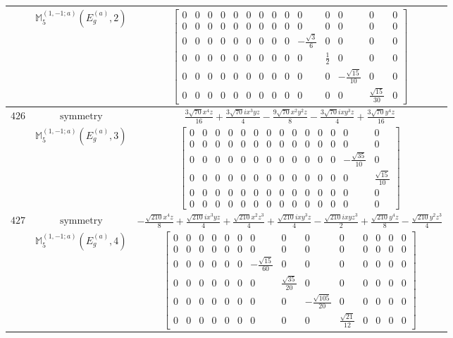 \documentclass[fleqn,8pt,landscape]{jsarticle}
\begin{document}
\begin{longtable}{ccc}
$  $ & $ \mathbb{M}_{5}^{(1,-1;a)}(E_{g}^{(a)},2) $ & $ \begin{bmatrix} 0 & 0 & 0 & 0 & 0 & 0 & 0 & 0 & 0 & 0 & 0 & 0 & 0 & 0 \\ 0 & 0 & 0 & 0 & 0 & 0 & 0 & 0 & 0 & 0 & 0 & 0 & 0 & 0 \\ 0 & 0 & 0 & 0 & 0 & 0 & 0 & 0 & 0 & - \frac{\sqrt{3}}{6} & 0 & 0 & 0 & 0 \\ 0 & 0 & 0 & 0 & 0 & 0 & 0 & 0 & 0 & 0 & \frac{1}{2} & 0 & 0 & 0 \\ 0 & 0 & 0 & 0 & 0 & 0 & 0 & 0 & 0 & 0 & 0 & - \frac{\sqrt{15}}{10} & 0 & 0 \\ 0 & 0 & 0 & 0 & 0 & 0 & 0 & 0 & 0 & 0 & 0 & 0 & \frac{\sqrt{15}}{30} & 0 \end{bmatrix} $ \\ \hline
$ 426 $ & $ \text{symmetry} $ & $ \frac{3 \sqrt{70} x^{4} z}{16} + \frac{3 \sqrt{70} i x^{3} y z}{4} - \frac{9 \sqrt{70} x^{2} y^{2} z}{8} - \frac{3 \sqrt{70} i x y^{3} z}{4} + \frac{3 \sqrt{70} y^{4} z}{16} $ \\
$  $ & $ \mathbb{M}_{5}^{(1,-1;a)}(E_{g}^{(a)},3) $ & $ \begin{bmatrix} 0 & 0 & 0 & 0 & 0 & 0 & 0 & 0 & 0 & 0 & 0 & 0 & 0 & 0 \\ 0 & 0 & 0 & 0 & 0 & 0 & 0 & 0 & 0 & 0 & 0 & 0 & 0 & 0 \\ 0 & 0 & 0 & 0 & 0 & 0 & 0 & 0 & 0 & 0 & 0 & 0 & - \frac{\sqrt{35}}{10} & 0 \\ 0 & 0 & 0 & 0 & 0 & 0 & 0 & 0 & 0 & 0 & 0 & 0 & 0 & \frac{\sqrt{15}}{10} \\ 0 & 0 & 0 & 0 & 0 & 0 & 0 & 0 & 0 & 0 & 0 & 0 & 0 & 0 \\ 0 & 0 & 0 & 0 & 0 & 0 & 0 & 0 & 0 & 0 & 0 & 0 & 0 & 0 \end{bmatrix} $ \\ \hline
$ 427 $ & $ \text{symmetry} $ & $ - \frac{\sqrt{210} x^{4} z}{8} + \frac{\sqrt{210} i x^{3} y z}{4} + \frac{\sqrt{210} x^{2} z^{3}}{4} + \frac{\sqrt{210} i x y^{3} z}{4} - \frac{\sqrt{210} i x y z^{3}}{2} + \frac{\sqrt{210} y^{4} z}{8} - \frac{\sqrt{210} y^{2} z^{3}}{4} $ \\
$  $ & $ \mathbb{M}_{5}^{(1,-1;a)}(E_{g}^{(a)},4) $ & $ \begin{bmatrix} 0 & 0 & 0 & 0 & 0 & 0 & 0 & 0 & 0 & 0 & 0 & 0 & 0 & 0 \\ 0 & 0 & 0 & 0 & 0 & 0 & 0 & 0 & 0 & 0 & 0 & 0 & 0 & 0 \\ 0 & 0 & 0 & 0 & 0 & 0 & - \frac{\sqrt{15}}{60} & 0 & 0 & 0 & 0 & 0 & 0 & 0 \\ 0 & 0 & 0 & 0 & 0 & 0 & 0 & \frac{\sqrt{35}}{20} & 0 & 0 & 0 & 0 & 0 & 0 \\ 0 & 0 & 0 & 0 & 0 & 0 & 0 & 0 & - \frac{\sqrt{105}}{20} & 0 & 0 & 0 & 0 & 0 \\ 0 & 0 & 0 & 0 & 0 & 0 & 0 & 0 & 0 & \frac{\sqrt{21}}{12} & 0 & 0 & 0 & 0 \end{bmatrix} $ \\ \hline

\end{longtable}
\end{document}

